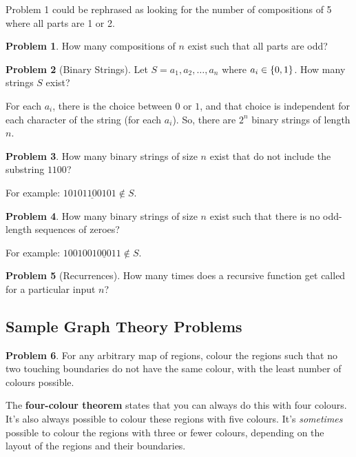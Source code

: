 \documentclass[]{article}
\theoremstyle{definition}
\newtheorem{problem}{Problem}[section]
\DeclarePairedDelimiter{\set}{\lbrace}{\rbrace}
\begin{document}
			Problem 1 could be rephrased as looking for the number of compositions of 5 where all parts are 1 or 2.

			\begin{problem}
				How many compositions of $n$ exist such that all parts are odd?
			\end{problem}

			\begin{problem}[Binary Strings]
				Let $S = a_1, a_2, \ldots, a_n$ where $a_i \in \set{0, 1}$. How many strings $S$ exist?
			\end{problem}

			For each $a_i$, there is the choice between $0$ or $1$, and that choice is independent for each character of the string (for each $a_i$). So, there are $2^n$ binary strings of length $n$.

			\begin{problem}
				How many binary strings of size $n$ exist that do not include the substring $1100$?
			\end{problem}

			For example: $1010\underline{1100}101 \not \in S$.

			\begin{problem}
				How many binary strings of size $n$ exist such that there is no odd-length sequences of zeroes?
			\end{problem}

			For example: $1001001\underline{000}11 \not \in S$.

			\begin{problem}[Recurrences]
				How many times does a recursive function get called for a particular input $n$?
			\end{problem}

		\subsection{Sample Graph Theory Problems}
			\begin{problem}
				For any arbitrary map of regions, colour the regions such that no two touching boundaries do not have the same colour, with the least number of colours possible.
			\end{problem}

			The \textbf{four-colour theorem} states that you can always do this with four colours. It's also always possible to colour these regions with five colours. It's \emph{sometimes} possible to colour the regions with three or fewer colours, depending on the layout of the regions and their boundaries.
\end{document}
